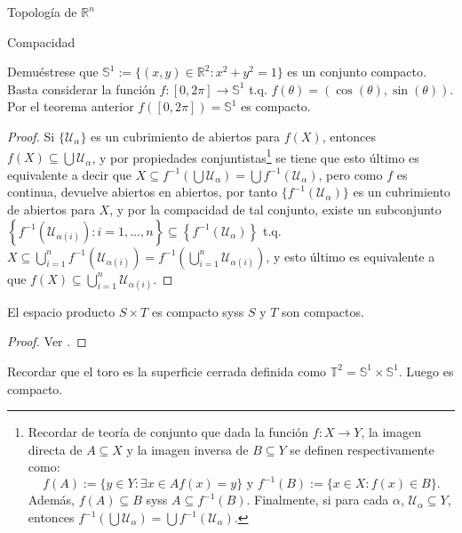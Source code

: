 \begin{chapter}{Topología de $\mathbb{R}^n$}
\begin{section}{Compacidad}
\begin{exmp}
Demuéstrese que $\mathbb{S}^1:=\{(x,y)\in\mathbb{R}^2:x^2+y^2=1\}$ es un conjunto compacto. Basta considerar la función $f:[0,2\pi]\to\mathbb{S}^1$ t.q. $f(\theta)=(\cos(\theta),\sin(\theta))$. Por el teorema anterior $f([0,2\pi])=\mathbb{S}^1$ es compacto.
\end{exmp}

\begin{proof}
Si $\{\mathcal{U}_\alpha\}$ es un cubrimiento de abiertos para $f(X)$, entonces $f(X)\subseteq\bigcup\mathcal{U}_\alpha$, y por propiedades conjuntistas\footnote{Recordar de teoría de conjunto que dada la función $f:X\to Y$, la imagen directa de $A\subseteq X$ y la imagen inversa de $B\subseteq Y$ se definen respectivamente como:$$f(A):=\{y\in Y:\exists x\in A f(x)=y\}\text{ y }f^{-1}(B):=\{x\in X:f(x)\in B\}.$$ Además, $f(A)\subseteq B$ syss $A\subseteq f^{-1}(B)$. Finalmente, si para cada $\alpha$, $\mathcal{U}_\alpha\subseteq Y$, entonces $f^{-1}\left(\bigcup\mathcal{U}_\alpha\right)=\bigcup f^{-1}\left(\mathcal{U}_\alpha\right)$.} se tiene que esto último es equivalente a decir que $X\subseteq f^{-1}\left(\bigcup\mathcal{U}_\alpha\right)=\bigcup f^{-1}(\mathcal{U}_\alpha)$, pero como $f$ es continua, devuelve abiertos en abiertos, por tanto $\{f^{-1}(\mathcal{U}_\alpha)\}$ es un cubrimiento de abiertos para $X$, y por la compacidad de tal conjunto, existe un subconjunto $\left\lbrace f^{-1}(\mathcal{U}_{\alpha(i)}):i=1,\ldots,n\right\rbrace\subseteq\left\lbrace f^{-1}\left(\mathcal{U}_\alpha\right)\right\rbrace$ t.q. $X\subseteq\bigcup_{i=1}^nf^{-1}\left(\mathcal{U}_{\alpha(i)}\right)=f^{-1}\left(\bigcup_{i=1}^n\mathcal{U}_{\alpha(i)}\right)$, y esto último es equivalente a que $f(X)\subseteq\bigcup_{i=1}^n\mathcal{U}_{\alpha(i)}$.
\end{proof}

\begin{them}
El espacio producto $S\times T$ es compacto syss $S$ y $T$ son compactos. 
\end{them}

\begin{proof}
Ver \cite[pp. 24, 25]{abraham}.
\end{proof}

\begin{exmp}
Recordar que el toro es la superficie cerrada definida como $\mathbb{T}^2=\mathbb{S}^1\times\mathbb{S}^1$. Luego es compacto. 
\end{exmp}


\end{section}
\end{chapter}
